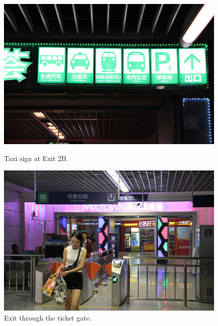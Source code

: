 \documentclass[11pt]{article}
\begin{document}
  \begin{figure}[!h]
	\begin{minipage}[t]{.5\textwidth}
     	\centering
        	\includegraphics[scale=0.27]{IMG_7183.jpg}
    		\caption{Taxi sign at Exit 2B.\label{7183}}
	\end{minipage}%
     \begin{minipage}[t]{.5\textwidth}
         \centering
       	 \includegraphics[scale=0.27]{IMG_7188.jpg}
		\caption{Exit through the ticket gate.\label{7188}}
    \end{minipage}%
 \end{figure}
\end{document}
